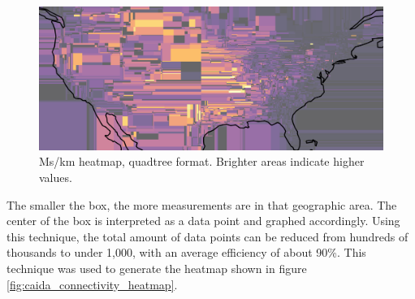 \begin{figure}[H]
    \centering
    \includegraphics[width=\textwidth]{images/CAIDA_connect_quadplot.png}
    \caption{Ms/km heatmap, quadtree format. Brighter areas indicate higher values.}
    \label{fig:caida_quadplot}
\end{figure}

The smaller the box, the more measurements are in that geographic area. The center of the box is interpreted as a data point and graphed accordingly. Using this technique, the total amount of data points can be reduced from hundreds of thousands to under 1,000, with an average efficiency of about 90\%. This technique was used to generate the heatmap shown in figure \ref{fig:caida_connectivity_heatmap}.
